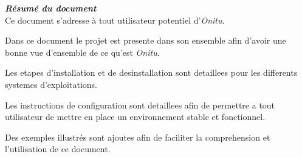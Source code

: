 \thispagestyle{empty}
\vspace*{10mm}

\textbf{\emph{\textcolor{onitu}{\large{Résumé du document} } } }\\

Ce document s'adresse à tout utilisateur potentiel d'\emph{Onitu}.

Dans ce document le projet est presente dans son ensemble afin d'avoir une bonne vue d'ensemble de ce qu'est \emph{Onitu}.

Les etapes d'installation et de desinstallation sont detaillees pour les differents systemes d'exploitations.

Les instructions de configuration sont detaillees afin de permettre a tout utilisateur de mettre en place un environnement stable et fonctionnel.

Des exemples illustrés sont ajoutes afin de faciliter la comprehension et l'utilisation de ce document.

\clearpage
